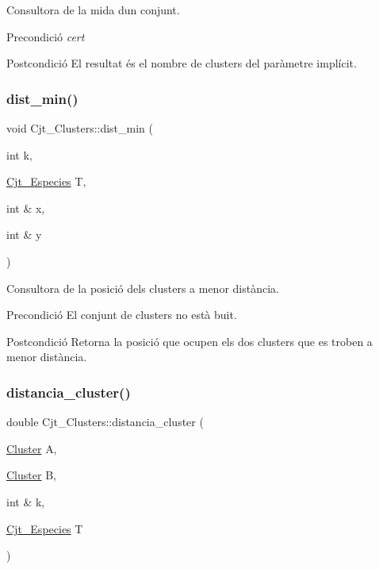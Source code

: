 Consultora de la mida d\textquotesingle{}un conjunt. 

\begin{DoxyPrecond}{Precondició}
{\itshape cert} 
\end{DoxyPrecond}
\begin{DoxyPostcond}{Postcondició}
El resultat és el nombre de clusters del paràmetre implícit. 
\end{DoxyPostcond}
\mbox{\label{class_cjt___clusters_a6cf197c0aa4bf1630c24fc0414f07378}} 
\subsubsection{\texorpdfstring{dist\+\_\+min()}{dist\_min()}}
{\footnotesize\ttfamily void Cjt\+\_\+\+Clusters\+::dist\+\_\+min (\begin{DoxyParamCaption}\item[{int}]{k,  }\item[{\hyperlink{class_cjt___especies}{Cjt\+\_\+\+Especies}}]{T,  }\item[{int \&}]{x,  }\item[{int \&}]{y }\end{DoxyParamCaption})}



Consultora de la posició dels clusters a menor distància. 

\begin{DoxyPrecond}{Precondició}
El conjunt de clusters no està buit. 
\end{DoxyPrecond}
\begin{DoxyPostcond}{Postcondició}
Retorna la posició que ocupen els dos clusters que es troben a menor distància. 
\end{DoxyPostcond}
\mbox{\label{class_cjt___clusters_a94f19cb7786aec229365c7dc6f72ce70}} 
\subsubsection{\texorpdfstring{distancia\+\_\+cluster()}{distancia\_cluster()}}
{\footnotesize\ttfamily double Cjt\+\_\+\+Clusters\+::distancia\+\_\+cluster (\begin{DoxyParamCaption}\item[{\hyperlink{class_cluster}{Cluster}}]{A,  }\item[{\hyperlink{class_cluster}{Cluster}}]{B,  }\item[{int \&}]{k,  }\item[{\hyperlink{class_cjt___especies}{Cjt\+\_\+\+Especies}}]{T }\end{DoxyParamCaption})}



